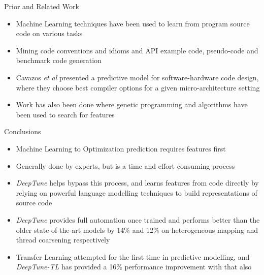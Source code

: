 \documentclass[10pt]{beamer}
\begin{document}
\begin{frame}{Prior and Related Work}
\begin{itemize}
\item<1->{Machine Learning techniques have been used to learn from program source code on various tasks}
\item<2->{Mining code conventions and idioms and API example code, pseudo-code and benchmark code generation}
\item<3->{Cavazos \textit{et al} presented a predictive model for software-hardware code design, where they choose best compiler options for a given micro-architecture setting}
\item<4->{Work has also been done where genetic programming and algorithms have been used to search for features}
\end{itemize}
\end{frame}

\begin{frame}{Conclusions}
\begin{itemize}
\item<1->{Machine Learning to Optimization prediction requires features first}
\item<2->{Generally done by experts, but is a time and effort consuming process}
\item<3->{\emph{DeepTune} helps bypass this process, and learns features from code directly by relying on powerful language modelling techniques to build representations of source code}
\item<4->{\emph{DeepTune} provides full automation once trained and performs better than the older state-of-the-art models by 14\% and 12\% on heterogeneous mapping and thread coarsening respectively}
\item<5->{Transfer Learning attempted for the first time in predictive modelling, and \emph{DeepTune-TL} has provided a 16\% performance improvement with that also}
\end{itemize}
\end{frame}
\end{document}
